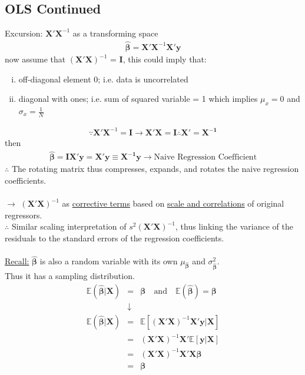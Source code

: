 \subsection{OLS Continued}
Excursion: $\boldsymbol{X'X}^{-1}$ as a transforming space
\begin{eqnarray*}
\boldsymbol{\hat{\beta}} = \boldsymbol{X'X}^{-1}\boldsymbol{X'y}
\end{eqnarray*}
now assume that $(\boldsymbol{X'X})^{-1}$ = $\boldsymbol{I}$, this could imply that:
\begin{enumerate}[(i)]
\item off-diagonal element 0; i.e. data is uncorrelated
\item diagonal with ones; i.e. sum of squared variable = 1 which implies $\mu_{x}=0$ and $\sigma_{x}=\frac{1}{N}$
\end{enumerate}
\begin{eqnarray*}
\because \boldsymbol{X'X}^{-1}=\boldsymbol{I} \to \boldsymbol{X'X}=\boldsymbol{I}
\therefore \boldsymbol{X'}=\boldsymbol{X^{-1}}
\end{eqnarray*}
then
\begin{eqnarray*}
\boldsymbol{\hat{\beta}}=\boldsymbol{IX'y}=\boldsymbol{X'y}\equiv\boldsymbol{X^{-1}y} \to\text{Naive Regression Coefficient}
\end{eqnarray*}
$\therefore$ The rotating matrix thus compresses, expands, and rotates the naive regression coefficients.\\
\\
$\to$ $(\boldsymbol{X'X})^{-1}$ as \underline{corrective terms} based on \underline{scale and correlations} of original regressors.\\
$\therefore$ Similar scaling interpretation of $s^{2}(\boldsymbol{X'X})^{-1}$, thus linking the variance of the residuals to the standard errors of the regression coefficients.\\
\\
\underline{Recall:}
$\boldsymbol{\hat{\beta}}$ is also a random variable with its own $\mu_{\boldsymbol{\hat{\beta}}}$ and $\sigma^{2}_{\boldsymbol{\hat{\beta}}}$.\\
Thus it has a sampling distribution.
\begin{eqnarray*}
\mathbb{E}(\boldsymbol{\hat{\beta}}|\boldsymbol{X}) &=& \boldsymbol{\beta}\quad\text{and}\quad\mathbb{E}(\boldsymbol{\hat{\beta}}) = \boldsymbol{\beta}\\
&\downarrow&\\
\mathbb{E}(\boldsymbol{\hat{\beta}}|\boldsymbol{X}) &=& \mathbb{E}[(\boldsymbol{X'X})^{-1}\boldsymbol{X'y}|\boldsymbol{X}]\\
&=& (\boldsymbol{X'X})^{-1}\boldsymbol{X'}\mathbb{E}[\boldsymbol{y}|\boldsymbol{X}]\\
&=& (\boldsymbol{X'X})^{-1}\boldsymbol{X'X\beta}\\
&=& \boldsymbol{\beta}
\end{eqnarray*}
